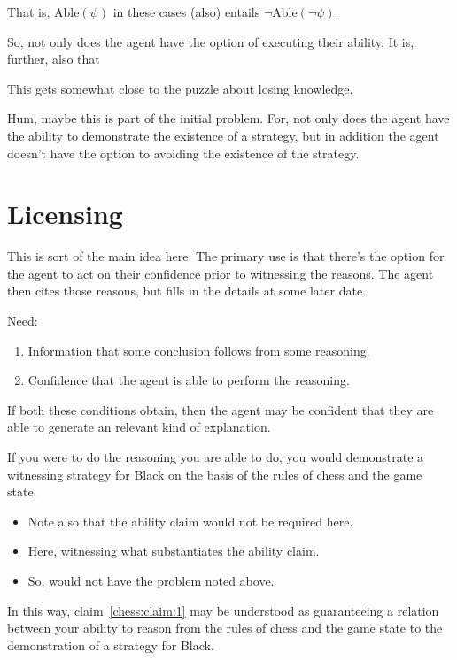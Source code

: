 \documentclass[10pt]{article}
\begin{document}
That is, \(\text{Able}(\psi)\) in these cases (also) entails \(\lnot\text{Able}(\lnot\psi)\).

So, not only does the agent have the option of executing their ability.
It is, further, also that

This gets somewhat close to the puzzle about losing knowledge.

Hum, maybe this is part of the initial problem.
For, not only does the agent have the ability to demonstrate the existence of a strategy, but in addition the agent doesn't have the option to avoiding the existence of the strategy. 


\section{Licensing}
\label{sec:licensing}

\begin{note}[Async]
  This is sort of the main idea here.
  The primary use is that there's the option for the agent to act on their confidence prior to witnessing the reasons.
  The agent then cites those reasons, but fills in the details at some later date.
\end{note}

\begin{note}
  Need:
  \begin{enumerate}
  \item Information that some conclusion follows from some reasoning.
  \item Confidence that the agent is able to perform the reasoning.
  \end{enumerate}
  If both these conditions obtain, then the agent may be confident that they are able to generate an {\color{red} relevant kind of} explanation.
\end{note}

If you were to do the reasoning you are able to do, you would demonstrate a witnessing strategy for Black on the basis of the rules of chess and the game state.

\begin{itemize}
\item Note also that the ability claim would not be required here.
\item Here, witnessing what substantiates the ability claim.
\item So, would not have the problem noted above.
\end{itemize}

In this way, claim~\ref{chess:claim:1} may be understood as guaranteeing a relation between your ability to reason from the rules of chess and the game state to the demonstration of a strategy for Black.
\end{document}
